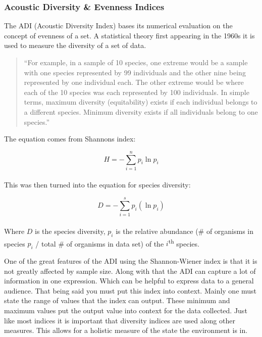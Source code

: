 \subsubsection{Acoustic Diversity \& Evenness Indices}
The ADI (Acoustic Diversity Index) bases it\textquotesingle s numerical evaluation on the concept of evenness of a set. A statistical theory first appearing in the 1960\textquotesingle s it is used to measure the diversity of a set of data.\par

\begin{quote}
  ``For example, in a sample of 10 species, one extreme would be a sample with one species represented by 99 individuals and the other nine being represented by one individual each. The other extreme would be where each of the 10 species was each represented by 100 individuals. In simple terms, maximum diversity (equitability) exists if each individual belongs to a different species. Minimum diversity exists if all individuals belong to one species.''\cite{shannonWiener}
\end{quote}

The equation comes from Shannon\textquotesingle s index:\par

\begin{equation}
  H = -\sum_{i=1}^n{p_i \ln p_i}
\end{equation} \\[-24pt]

This was then turned into the equation for species diversity:\par

\begin{equation}
  D = -\sum_{i=1}^s{p_i (\ln p_i)}
\end{equation} \\[-24pt]

Where $D$ is the species diversity, $p_i$ is the relative abundance (\# of organisms in species $p_i$ / total \# of organisms in data set) of the $i$\textsuperscript{th} species.\par
One of the great features of the ADI using the Shannon-Wiener index is that it is not greatly affected by sample size. Along with that the ADI can capture a lot of information in one expression. Which can be helpful to express data to a general audience. That being said you must put this index into context. Mainly one must state the range of values that the index can output. These minimum and maximum values put the output value into context for the data collected. Just like most indices it is important that diversity indices are used along other measures. This allows for a holistic measure of the state the environment is in.\cite{shannonWiener}\par
